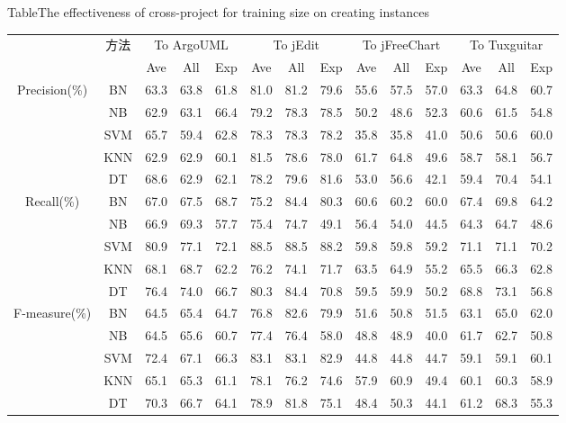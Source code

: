 \begin{table} [h]
{Table$\!$}{The effectiveness of cross-project for training size on creating instances}
\vspace{0.5em}
\centering
\footnotesize
\begin{tabular}{cccccccccccccc}
\toprule[1.5pt]
~\multirow{2}{*}{评估指标}&\multirow{2}{*}{方法}&\multicolumn{3}{c}{To ArgoUML}&\multicolumn{3}{c}{To jEdit}&\multicolumn{3}{c}{To jFreeChart}&\multicolumn{3}{c}{To  Tuxguitar}\\
~&~&{Ave}&{All}&{Exp}&{Ave}&{All}&{Exp}&{Ave}&{All}&{Exp}&{Ave}&{All}&{Exp}\\
\midrule[1pt]
\multirow{5}{*}{Precision(\%)}
&BN&63.3&63.8&61.8&81.0&81.2&79.6&55.6&57.5&57.0&63.3&64.8&60.7\\
&NB&62.9&63.1&66.4&79.2&78.3&78.5&50.2&48.6&52.3&60.6&61.5&54.8\\
&SVM&65.7&59.4&62.8&78.3&78.3&78.2&35.8&35.8&41.0&50.6&50.6&60.0\\
&KNN&62.9&62.9&60.1&81.5&78.6&78.0&	61.7&64.8&49.6&58.7&58.1&56.7\\
&DT&68.6&62.9&62.1&78.2&79.6&81.6&	53.0&56.6&42.1&59.4&70.4&54.1\\
\multirow{5}{*}{Recall(\%)}															
&BN&67.0&67.5&68.7&75.2&84.4&80.3&60.6&60.2&60.0&67.4&69.8&64.2\\
&NB&66.9&69.3&57.7&75.4&74.7&49.1&56.4&54.0&44.5&64.3&64.7&48.6\\
&SVM&80.9&77.1&72.1&88.5&88.5&88.2&59.8&59.8&59.2&71.1&71.1&70.2\\
&KNN&68.1&68.7&62.2&76.2&74.1&71.7&63.5&64.9&55.2&65.5&66.3&62.8\\
&DT	&76.4&74.0&66.7&80.3&84.4&70.8&59.5&59.9&50.2&68.8&73.1&56.8\\
\multirow{5}{*}{F-measure(\%)}					
&BN&64.5&65.4&64.7&76.8&82.6&79.9&51.6&50.8&51.5&63.1&65.0&62.0\\
&NB&64.5&65.6&60.7&77.4&76.4&58.0&48.8&48.9&40.0&61.7&62.7&50.8\\
&SVM&72.4&67.1&66.3&83.1&83.1&82.9&44.8&44.8&44.7&59.1&59.1&60.1\\
&KNN&65.1&65.3&61.1&78.1&76.2&74.6&57.9&60.9&49.4&60.1&60.3&58.9\\
&DT	&70.3&66.7&64.1&78.9&81.8&75.1&48.4&50.3&44.1&61.2&68.3&55.3\\
\bottomrule[1.5pt]
\end{tabular}
\end{table}

